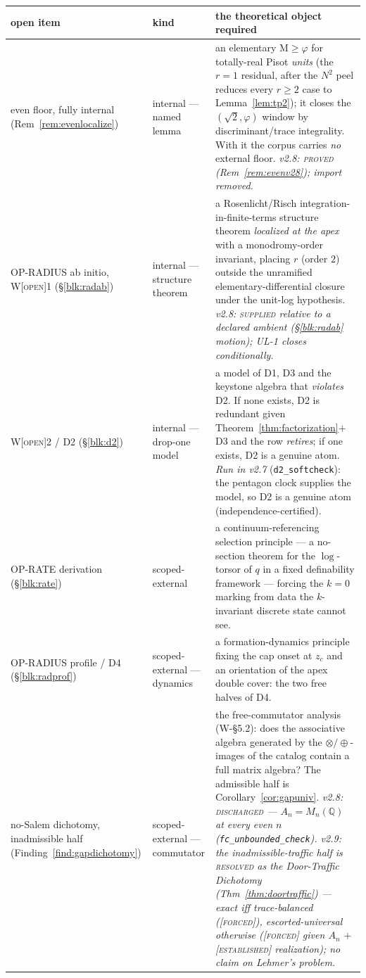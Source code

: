 \documentclass[11pt]{article}
\newcommand{\tagF}{\textcolor{cF}{\textsc{[forced]}}}
\newcommand{\tagE}{\textcolor{cE}{\textsc{[established]}}}
\newcommand{\tagO}{\textcolor{cO}{\textsc{[open]}}}
\newcommand{\Q}{\mathbb{Q}}
\newcommand{\gp}{\varphi}
\newcommand{\M}{\mathrm{M}}
\theoremstyle{plain}
\theoremstyle{definition}
\theoremstyle{remark}
\begin{document}
\begin{center}\footnotesize\setlength{\tabcolsep}{4pt}
\begin{tabular}{@{}p{3.5cm}p{1.9cm}p{8.3cm}@{}}
\toprule
open item & kind & the theoretical object required\\
\midrule
even floor, fully internal (Rem~\ref{rem:evenlocalize}) & internal --- named lemma & an elementary $\M\ge\gp$ for totally-real Pisot \emph{units} (the $r=1$ residual, after the $N^2$ peel reduces every $r\ge2$ case to Lemma~\ref{lem:tp2}); it closes the $(\sqrt2,\gp)$ window by discriminant/trace integrality. With it the corpus carries \emph{no} external floor. \emph{v2.8: \textsc{proved} (Rem~\ref{rem:evenv28}); import removed.}\\[2pt]
OP-RADIUS ab initio, W\tagO{}1 (\S\ref{blk:radab}) & internal --- structure theorem & a Rosenlicht/Risch integration-in-finite-terms structure theorem \emph{localized at the apex} with a monodromy-order invariant, placing $r$ (order $2$) outside the unramified elementary-differential closure under the unit-log hypothesis. \emph{v2.8: \textsc{supplied} relative to a declared ambient (\S\ref{blk:radab} motion); UL-1 closes conditionally.}\\[2pt]
W\tagO{}2 / D2 (\S\ref{blk:d2}) & internal --- drop-one model & a model of D1, D3 and the keystone algebra that \emph{violates} D2. If none exists, D2 is redundant given Theorem~\ref{thm:factorization}$+$D3 and the row \emph{retires}; if one exists, D2 is a genuine atom. \emph{Run in v2.7} (\texttt{d2\_softcheck}): the pentagon clock supplies the model, so D2 is a genuine atom (independence-certified).\\[2pt]
OP-RATE derivation (\S\ref{blk:rate}) & scoped-external & a continuum-referencing selection principle --- a no-section theorem for the $\log$-torsor of $q$ in a fixed definability framework --- forcing the $k=0$ marking from data the $k$-invariant discrete state cannot see.\\[2pt]
OP-RADIUS profile / D4 (\S\ref{blk:radprof}) & scoped-external --- dynamics & a formation-dynamics principle fixing the cap onset at $z_c$ and an orientation of the apex double cover: the two free halves of D4.\\[2pt]
no-Salem dichotomy, inadmissible half (Finding~\ref{find:gapdichotomy}) & scoped-external --- commutator & the free-commutator analysis (W-\S5.2): does the associative algebra generated by the $\otimes/\oplus$-images of the catalog contain a full matrix algebra? The admissible half is Corollary~\ref{cor:gapuniv}. \emph{v2.8: \textsc{discharged} --- $A_n=M_n(\Q)$ at every even $n$ (\texttt{fc\_unbounded\_check}). v2.9: the inadmissible-\emph{traffic} half is \textsc{resolved} as the Door-Traffic Dichotomy (Thm~\ref{thm:doortraffic}) --- exact iff trace-balanced (\tagF{}), escorted-universal otherwise (\tagF{} given $A_n$ $+$ \tagE{} realization); no claim on Lehmer's problem.}\\[2pt]

\end{tabular}
\end{center}
\end{document}
